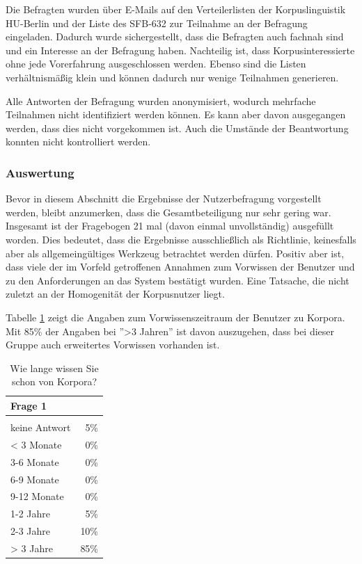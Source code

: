 Die Befragten wurden über E-Mails auf den Verteilerlisten der Korpuslinguistik HU-Berlin und der Liste des SFB-632 zur Teilnahme an der Befragung eingeladen. Dadurch wurde sichergestellt, dass die Befragten auch fachnah sind und ein Interesse an der Befragung haben. Nachteilig ist, dass Korpusinteressierte ohne jede Vorerfahrung ausgeschlossen werden. Ebenso sind die Listen verhältnismäßig klein und können dadurch nur wenige Teilnahmen generieren.

Alle Antworten der Befragung wurden anonymisiert, wodurch mehrfache Teilnahmen nicht identifiziert werden können. Es kann aber davon ausgegangen werden, dass dies nicht vorgekommen ist. Auch die Umstände der Beantwortung konnten nicht kontrolliert werden.

\subsubsection{Auswertung}\label{sec:Nutzerbefragung.Auswertung}

Bevor in diesem Abschnitt die Ergebnisse der Nutzerbefragung vorgestellt werden, bleibt anzumerken, dass die Gesamtbeteiligung nur sehr gering war. Insgesamt ist der Fragebogen 21 mal (davon einmal unvollständig) ausgefüllt worden. Dies bedeutet, dass die Ergebnisse ausschließlich als Richtlinie, keinesfalls aber als allgemeingültiges Werkzeug betrachtet werden dürfen. Positiv aber ist, dass viele der im Vorfeld getroffenen Annahmen zum Vorwissen der Benutzer und zu den Anforderungen an das System bestätigt wurden. Eine Tatsache, die nicht zuletzt an der Homogenität der Korpusnutzer liegt.

Tabelle \ref{tab:Frage1} zeigt die Angaben zum Vorwissenszeitraum der Benutzer zu Korpora. Mit 85\% der Angaben bei ''>3 Jahren'' ist davon auszugehen, dass bei dieser Gruppe auch erweitertes Vorwissen vorhanden ist. 

	\begin{table}[H]
		\centering
		\begin{tabular}{l | r}
					Frage 1 & \\
					\hline\\
					keine Antwort	& 5\% \\
					<  3 Monate 	& 0\% \\
					3-6 Monate	& 0\% \\
					6-9 Monate 	& 0\% \\
					9-12 Monate	& 0\% \\
					1-2 Jahre		& 5\% \\
					2-3 Jahre		& 10\% \\
					> 3 Jahre		& 85\%
		\end{tabular}
		\caption{Wie lange wissen Sie schon von Korpora?}\label{tab:Frage1}
	\end{table}

